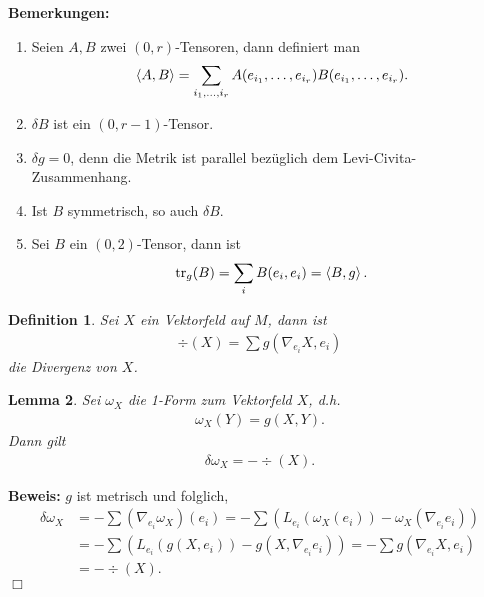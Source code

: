 \documentclass[12pt,a4paper]{article}
\def\R{\mathbb{R}}
\def\tr{\mathrm{tr}}
\newtheorem{Lemma}{Lemma}[section]
\newtheorem{Definition}[Lemma]{Definition}
\def\proof{\noindent\textbf{Beweis:}\quad}
\def\qed{\quad\hfill\ensuremath{\Box}}
\begin{document}
\bigskip

{\bf Bemerkungen:}
\begin{enumerate}
  \item 
Seien $A,B$ zwei $(0,r)$-Tensoren, dann definiert man
\begin{align*}
\left\langle A,B\right\rangle = \sum_{i_1,\ldots,i_r}
A(e_{i_1},\ldots,e_{i_r})B(e_{i_1},\ldots,e_{i_r}).
\end{align*}
\item $\delta B$ ist ein $(0,r-1)$-Tensor.
\item $\delta g = 0$, denn die Metrik ist parallel bez\"uglich dem
Levi-Civita-Zusammenhang.
\item Ist $B$ symmetrisch, so auch $\delta B$.
\item Sei $B$ ein $(0,2)$-Tensor, dann ist
\begin{align*}
\tr_g(B) = \sum_i B(e_i,e_i) = \scp{B,g}.
\end{align*}
\end{enumerate}

\bigskip

\begin{Definition}
Sei $X$ ein Vektorfeld auf $M$, dann ist
\begin{align*}
\div(X) = \sum g(\nabla_{e_i}X,e_i)
\end{align*}
die Divergenz von $X$.
\end{Definition}
% 

\bigskip

\begin{Lemma}
Sei $\omega_X$ die 1-Form zum Vektorfeld $X$, d.h.
\begin{align*}
\omega_X(Y) = g(X,Y).
\end{align*}
Dann gilt
\begin{align*}
\delta \omega_X = -\div(X).
\end{align*}
\end{Lemma}

\proof
$g$ ist metrisch und folglich,
\begin{align*}
\delta\omega_X &= -\sum(\nabla_{e_i}\omega_X)(e_i)
= -\sum\left(L_{e_i}(\omega_X(e_i)) - \omega_X(\nabla_{e_i}e_i)\right)\\
&= -\sum\left(L_{e_i}(g(X,e_i)) - g(X,\nabla_{e_i}e_i)\right)
= -\sum g(\nabla_{e_i}X,e_i)\\
& = -\div(X).
\end{align*}
\qed
\end{document}
